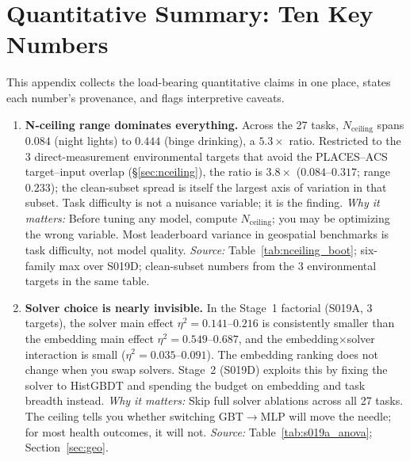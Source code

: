 \documentclass{article}
\begin{document}
\section{Quantitative Summary: Ten Key Numbers}
\label{app:key_numbers}

This appendix collects the load-bearing quantitative claims in one place, states each number's provenance, and flags interpretive caveats.

\begin{enumerate}

\item \textbf{N-ceiling range dominates everything.}
Across the 27 tasks, $N_{\text{ceiling}}$ spans $0.084$ (night lights) to $0.444$ (binge drinking), a $5.3{\times}$ ratio. Restricted to the 3 direct-measurement environmental targets that avoid the PLACES--ACS target--input overlap (\S\ref{sec:nceiling}), the ratio is $3.8{\times}$ ($0.084$--$0.317$; range $0.233$); the clean-subset spread is itself the largest axis of variation in that subset. Task difficulty is not a nuisance variable; it is the finding.
\emph{Why it matters:} Before tuning any model, compute $N_{\text{ceiling}}$; you may be optimizing the wrong variable. Most leaderboard variance in geospatial benchmarks is task difficulty, not model quality.
\emph{Source:} Table~\ref{tab:nceiling_boot}; six-family max over S019D; clean-subset numbers from the 3 environmental targets in the same table.

\item \textbf{Solver choice is nearly invisible.}
In the Stage~1 factorial (S019A, 3 targets), the solver main effect $\eta^2 = 0.141$--$0.216$ is consistently smaller than the embedding main effect $\eta^2 = 0.549$--$0.687$, and the embedding$\times$solver interaction is small ($\eta^2 = 0.035$--$0.091$). The embedding ranking does not change when you swap solvers. Stage~2 (S019D) exploits this by fixing the solver to HistGBDT and spending the budget on embedding and task breadth instead.
\emph{Why it matters:} Skip full solver ablations across all 27 tasks. The ceiling tells you whether switching GBT$\to$MLP will move the needle; for most health outcomes, it will not.
\emph{Source:} Table~\ref{tab:s019a_anova}; Section~\ref{sec:geo}.


\end{enumerate}
\end{document}

